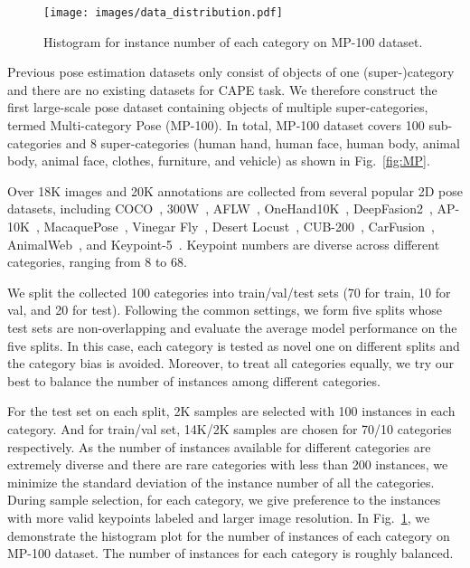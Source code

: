 \documentclass[runningheads]{llncs}
\begin{document}
\begin{figure}[t]
	\centering
	\texttt{[image: images/data\_distribution.pdf]}
	\caption{
	Histogram for instance number of each category on MP-100 dataset.
	}
	\label{fig:data_dist}
\end{figure}


Previous pose estimation datasets only consist of objects of one (super-)category and there are no existing datasets for CAPE task. We therefore construct the first large-scale pose dataset containing objects of multiple super-categories, termed Multi-category Pose (MP-100). In total, MP-100 dataset covers 100 sub-categories and 8 super-categories (human hand, human face, human body, animal body, animal face, clothes, furniture, and vehicle) as shown in Fig.~\ref{fig:MP}. 

Over 18K images and 20K annotations are collected from several popular 2D pose datasets, including COCO~\cite{lin2014microsoft}, 300W~\cite{300w}, AFLW~\cite{aflw}, OneHand10K~\cite{wang2018mask}, DeepFasion2~\cite{ge2019deepfashion2}, AP-10K~\cite{yu2021ap}, MacaquePose~\cite{labuguen2021macaquepose}, Vinegar Fly~\cite{pereira2019fast}, Desert Locust~\cite{graving2019deepposekit}, CUB-200~\cite{cub-200-2011}, CarFusion~\cite{reddy2018carfusion}, AnimalWeb~\cite{khan2020animalweb}, and Keypoint-5~\cite{wu2016single}. Keypoint numbers are diverse across different categories, ranging from 8 to 68.

We split the collected 100 categories into train/val/test sets (70 for train, 10 for val, and 20 for test). Following the common settings, we form five splits whose test sets are non-overlapping and evaluate the average model performance on the five splits. In this case, each category is tested as novel one on different splits and the category bias is avoided. Moreover, to treat all categories equally, we try our best to balance the number of instances among different categories. 

For the test set on each split, 2K samples are selected with 100 instances in each category. And for train/val set, 14K/2K samples are chosen for 70/10 categories respectively. As the number of instances available for different categories are extremely diverse and there are rare categories with less than 200 instances, we minimize the standard deviation of the instance number of all the categories. 
During sample selection, for each category, we give preference to the instances with more valid keypoints labeled and larger image resolution. 
In Fig.~\ref{fig:data_dist}, we demonstrate the histogram plot for the number of instances of each category on MP-100 dataset. The number of instances for each category is roughly balanced.
\end{document}
